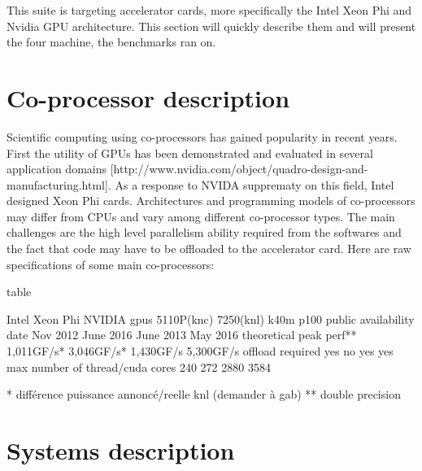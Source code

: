 
This suite is targeting accelerator cards, more specifically the Intel Xeon Phi and Nvidia GPU architecture. This section will quickly describe them and will present the four machine, the benchmarks ran on.

\section{Co-processor description}
Scientific computing using co-processors has gained popularity in recent years. First the utility of GPUs has been demonstrated and evaluated in several application domains [http://www.nvidia.com/object/quadro-design-and-manufacturing.html]. As a response to NVIDA supprematy on this field, Intel designed Xeon Phi cards.
Architectures and programming models of co-processors may differ from CPUs and vary among different co-processor types. The main challenges are the high level parallelism ability required from the softwares and the fact that code may have to be offloaded to the accelerator card.
Here are raw specifications of some main co-processors:

table

      Intel Xeon Phi    NVIDIA gpus
   5110P(knc) 7250(knl) k40m p100
public availability date Nov 2012 June 2016 June 2013 May 2016
theoretical peak perf** 1,011GF/s* 3,046GF/s* 1,430GF/s 5,300GF/s
offload required yes no yes yes
max number of thread/cuda cores 240 272 2880 3584

* différence puissance annoncé/reelle knl (demander à gab)
** double precision

\section{Systems description}

